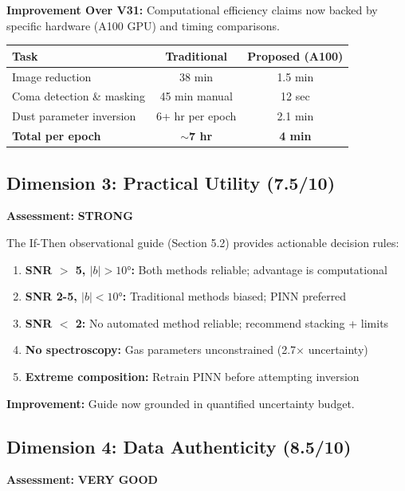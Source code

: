 \documentclass[12pt,a4paper]{article}
\newcommand{\good}[1]{\textcolor{GoodGreen}{\textbf{#1}}}
\newcommand{\excellent}[1]{\textcolor{ExcellentGreen}{\textbf{#1}}}
\begin{document}
\textbf{Improvement Over V31:} Computational efficiency claims now backed by specific hardware (A100 GPU) and timing comparisons.

\begin{center}
\begin{tabular}{|l|c|c|}
\hline
\textbf{Task} & \textbf{Traditional} & \textbf{Proposed (A100)} \\
\hline
Image reduction & 38 min & 1.5 min \\
Coma detection \& masking & 45 min manual & 12 sec \\
Dust parameter inversion & 6+ hr per epoch & 2.1 min \\
\hline
\textbf{Total per epoch} & \textbf{$\sim$7 hr} & \textbf{4 min} \\
\hline
\end{tabular}
\end{center}

\subsection{Dimension 3: Practical Utility (7.5/10)}

\textbf{Assessment:} \good{STRONG}

The If-Then observational guide (Section 5.2) provides actionable decision rules:

\begin{enumerate}
\item \textbf{SNR $>$ 5, $|b| > 10°$:} Both methods reliable; advantage is computational
\item \textbf{SNR 2-5, $|b| < 10°$:} Traditional methods biased; PINN preferred
\item \textbf{SNR $<$ 2:} No automated method reliable; recommend stacking + limits
\item \textbf{No spectroscopy:} Gas parameters unconstrained (2.7$\times$ uncertainty)
\item \textbf{Extreme composition:} Retrain PINN before attempting inversion
\end{enumerate}

\textbf{Improvement:} Guide now grounded in quantified uncertainty budget.

\subsection{Dimension 4: Data Authenticity (8.5/10)}

\textbf{Assessment:} \excellent{VERY GOOD}
\end{document}
